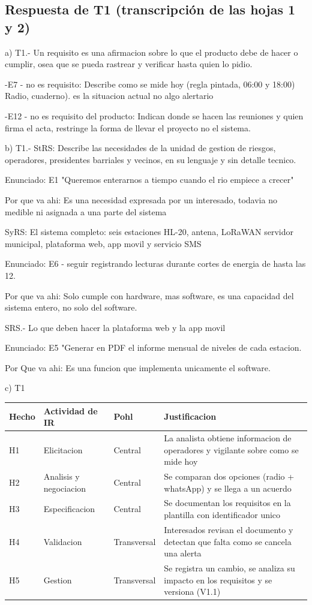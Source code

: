 \documentclass[11pt]{article}
\newcommand{\subseccion}[1]{\subsection{\textcolor{midblue}{#1}}}
\begin{document}
\subseccion{Respuesta de T1 (transcripción de las hojas 1 y 2)}

a) T1.- Un requisito es una afirmacion sobre lo que el producto debe de hacer o cumplir, osea que se pueda rastrear y verificar hasta quien lo pidio.

-E7 - no es requisito: Describe como se mide hoy (regla pintada, 06:00 y 18:00) Radio, cuaderno). es la situacion actual no algo alertario

-E12 - no es requisito del producto: Indican donde se hacen las reuniones y quien firma el acta, restringe la forma de llevar el proyecto no el sistema.

b) T1.- StRS: Describe las necesidades de la unidad de gestion de riesgos, operadores, presidentes barriales y vecinos, en su lenguaje y sin detalle tecnico.

Enunciado: E1 "Queremos enterarnos a tiempo cuando el rio empiece a crecer"

Por que va ahi: Es una necesidad expresada por un interesado, todavia no medible ni asignada a una parte del sistema

SyRS: El sistema completo: seis estaciones HL-20, antena, LoRaWAN servidor municipal, plataforma web, app movil y servicio SMS

Enunciado: E6 - seguir registrando lecturas durante cortes de energia de hasta las 12.

Por que va ahi: Solo cumple con hardware, mas software, es una capacidad del sistema entero, no solo del software.

SRS.- Lo que deben hacer la plataforma web y la app movil

Enunciado: E5 "Generar en PDF el informe mensual de niveles de cada estacion.

Por Que va ahi: Es una funcion que implementa unicamente el software.

c) T1

{\small
\begin{longtable}{|L{1.2cm}|L{3.4cm}|L{2.2cm}|L{8.3cm}|}
	\hline
	Hecho & Actividad de IR & Pohl & Justificacion \\ \hline
	\endhead
	H1 & Elicitacion & Central & La analista obtiene informacion de operadores y vigilante sobre como se mide hoy \\ \hline
	H2 & Analisis y negociacion & Central & Se comparan dos opciones (radio + whatsApp) y se llega a un acuerdo \\ \hline
	H3 & Especificacion & Central & Se documentan los requisitos en la plantilla con identificador unico \\ \hline
	H4 & Validacion & Transversal & Interesados revisan el documento y detectan que falta como se cancela una alerta \\ \hline
	H5 & Gestion & Transversal & Se registra un cambio, se analiza su impacto en los requisitos y se versiona (V1.1) \\ \hline
\end{longtable}
}
\end{document}
